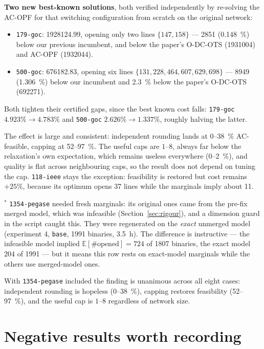 \documentclass[11pt]{article}
\newcommand{\code}[1]{\texttt{\small #1}}
\begin{document}
\noindent
\textbf{Two new best-known solutions}, both verified independently by re-solving the AC-OPF for that
switching configuration from scratch on the original network:
\begin{itemize}
  \item \code{179-goc}: \num{1928124.99}, opening only two lines $\{147, 158\}$ --- \num{2851}
        (\SI{0.148}{\percent}) below our previous incumbent, and below the paper's O-DC-OTS
        (\num{1931004}) and AC-OPF (\num{1932044}).
  \item \code{500-goc}: \num{676182.83}, opening six lines $\{131, 228, 464, 607, 629, 698\}$ ---
        \num{8949} (\SI{1.306}{\percent}) below our incumbent and \SI{2.3}{\percent} below the paper's
        O-DC-OTS (\num{692271}).
\end{itemize}
Both tighten their certified gaps, since the best known cost falls: \code{179-goc}
$4.923\% \to 4.783\%$ and \code{500-goc} $2.626\% \to 1.337\%$, roughly halving the latter.

The effect is large and consistent: independent rounding lands at 0--\SI{38}{\percent} AC-feasible,
capping at 52--\SI{97}{\percent}. The useful caps are $1$--$8$, always far below the relaxation's own
expectation, which remains useless everywhere (0--\SI{2}{\percent}), and quality is flat across
neighbouring caps, so the result does not depend on tuning the cap. \code{118-ieee} stays the exception:
feasibility is restored but cost remains $+25\%$, because its optimum opens \num{37} lines while the
marginals imply about 11.

$^{*}$ \code{1354-pegase} needed fresh marginals: its original ones came from the pre-fix merged model,
which was infeasible (Section~\ref{sec:rigour}), and a dimension guard in the script caught this. They
were regenerated on the \emph{exact} unmerged model (experiment 4, \code{base}, \num{1991} binaries,
\SI{3.5}{\hour}). The difference is instructive --- the infeasible model implied
$\mathbb{E}[\#\text{opened}] = 724$ of \num{1807} binaries, the exact model $204$ of \num{1991} --- but it
means this row rests on exact-model marginals while the others use merged-model ones.

With \code{1354-pegase} included the finding is unanimous across all eight cases: independent rounding is
hopeless (0--\SI{38}{\percent}), capping restores feasibility (52--\SI{97}{\percent}), and the useful cap
is $1$--$8$ regardless of network size.

\section{Negative results worth recording}
\end{document}
